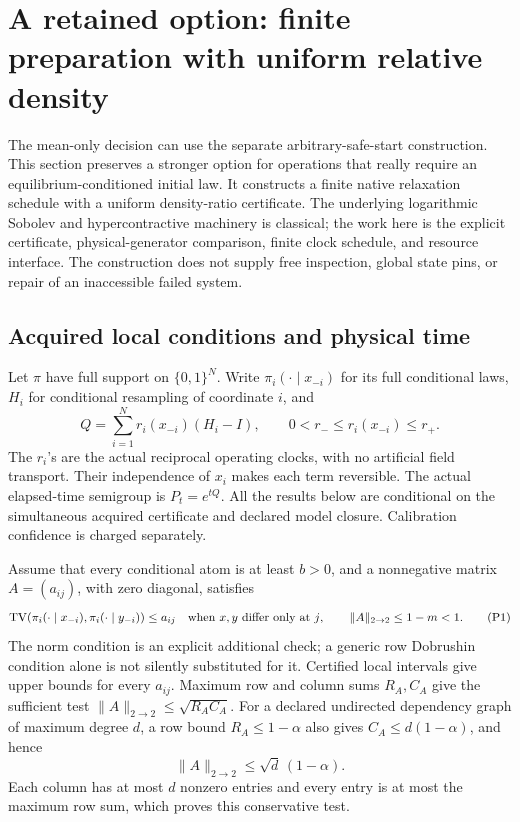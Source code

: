 \section{A retained option: finite preparation with uniform relative density}
\label{sec:next6prep}

The mean-only decision can use the separate arbitrary-safe-start construction.
This section preserves a stronger option for operations that really require an
equilibrium-conditioned initial law. It constructs a finite native relaxation
schedule with a uniform density-ratio certificate. The underlying logarithmic
Sobolev and hypercontractive machinery is classical; the work here is the
explicit certificate, physical-generator comparison, finite clock schedule,
and resource interface. The construction does not supply free inspection,
global state pins, or repair of an inaccessible failed system.

\subsection{Acquired local conditions and physical time}

Let \(\pi\) have full support on \(\{0,1\}^N\). Write \(\pi_i(\cdot\mid x_{-i})\)
for its full conditional laws, \(H_i\) for conditional resampling of coordinate
\(i\), and
\[
 Q=\sum_{i=1}^N r_i(x_{-i})(H_i-I),\qquad
 0<r_-\le r_i(x_{-i})\le r_+ .
\]
The \(r_i\)'s are the actual reciprocal operating clocks, with no artificial
field transport. Their independence of \(x_i\) makes each term reversible.
The actual elapsed-time semigroup is \(P_t=e^{tQ}\). All the results below are
conditional on the simultaneous acquired certificate and declared model
closure. Calibration confidence is charged separately.

Assume that every conditional atom is at least \(b>0\), and a nonnegative
matrix \(A=(a_{ij})\), with zero diagonal, satisfies
\[
 \operatorname{TV}\!\left(
   \pi_i(\cdot\mid x_{-i}),\pi_i(\cdot\mid y_{-i})
 \right)\le a_{ij}
 \quad\hbox{when \(x,y\) differ only at \(j\)},\qquad
 \|A\|_{2\to2}\le1-m<1.                         \tag{P1}
\]
The norm condition is an explicit additional check; a generic row Dobrushin
condition alone is not silently substituted for it. Certified local intervals
give upper bounds for every \(a_{ij}\). Maximum row and column sums \(R_A,C_A\)
give the sufficient test \(\|A\|_{2\to2}\le\sqrt{R_A C_A}\).
For a declared undirected dependency graph of maximum degree \(d\), a
row bound \(R_A\le1-\alpha\) also gives \(C_A\le d(1-\alpha)\), and hence
\[
 \|A\|_{2\to2}\le \sqrt d\,(1-\alpha).           \tag{P2}
\]
Each column has at most \(d\) nonzero entries and every entry is at most the
maximum row sum, which proves this conservative test.

